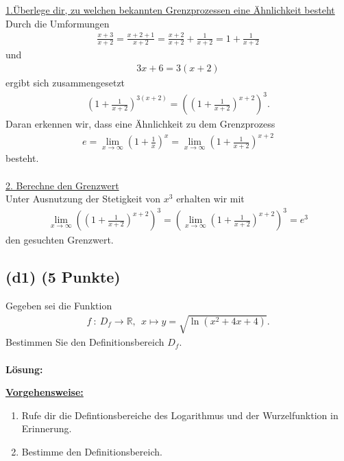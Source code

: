 \underline{1.Überlege dir, zu welchen bekannten Grenzprozessen eine Ähnlichkeit besteht}\\
Durch die Umformungen 
\begin{align*}
\frac{x+3}{x+2} = \frac{x+2+1}{x+2} = \frac{x+2}{x+2} + \frac{1}{x+2} = 1 + \frac{1}{x+2}
\end{align*}
und
\begin{align*}
3x+6 = 3(x+2)
\end{align*}
ergibt sich zusammengesetzt
\begin{align*}
\left(1 + \frac{1}{x+2}\right)^{3(x+2)}
=
\left( \left(1 + \frac{1}{x+2}\right)^{x+2} \right)^3. 
\end{align*} 
Daran erkennen wir, dass eine Ähnlichkeit zu dem Grenzprozess
\begin{align*}
e = \lim \limits_{x \rightarrow \infty} \left(1+\frac{1}{x}\right)^x
= \lim \limits_{x \rightarrow \infty} \left(1+\frac{1}{x+2}\right)^{x+2}
\end{align*}
besteht.\\
\\
\underline{2. Berechne den Grenzwert}\\
Unter Ausnutzung der Stetigkeit von $x^3$ erhalten wir mit
\begin{align*}
\lim \limits_{x \rightarrow \infty} \left( \left(1 + \frac{1}{x+2}\right)^{x+2} \right)^3
= \left( \lim \limits_{x \rightarrow \infty} \left(1 + \frac{1}{x+2}\right)^{x+2} \right)^3
= e^3 
\end{align*}
den gesuchten Grenzwert.

\newpage
\subsection*{(d1) (5 Punkte)}
Gegeben sei die Funktion
\begin{align*}
f \ : \ D_f \to \mathbb{R}, \ \ x \mapsto y = \sqrt{\ln(x^2+4x+4)}.
\end{align*}
Bestimmen Sie den Definitionsbereich $D_f$.
\\
\\
\textbf{Lösung:}
\begin{mdframed}
\underline{\textbf{Vorgehensweise:}}
\begin{enumerate}
\item Rufe dir die Defintionsbereiche des Logarithmus und der Wurzelfunktion in Erinnerung.
\item Bestimme den Definitionsbereich.
\end{enumerate}
\end{mdframed}

